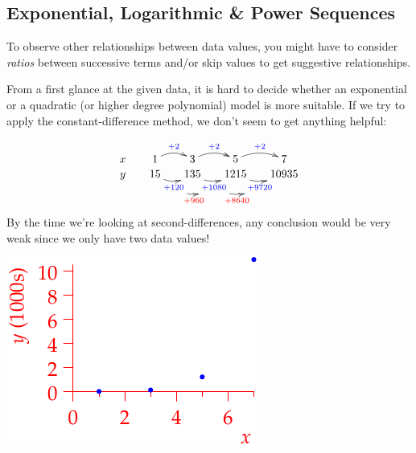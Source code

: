 \clearpage





\subsection{Exponential, Logarithmic \& Power Sequences}

To observe other relationships between data values, you might have to consider \emph{ratios} between successive terms and/or skip values to get suggestive relationships.

\begin{example}{}{}
From a first glance at the given data, it is hard to decide whether an exponential or a quadratic (or higher degree polynomial) model is more suitable. If we try to apply the constant-difference method, we don't seem to get anything helpful:\par
\begin{minipage}[t]{0.65\linewidth}\vspace{0pt}
\[
	\xymatrix @R0pt @C15pt{
		x & 1 \ar@/^/[r]^{\textcolor{blue}{+2}} & 3 \ar@/^/[r]^{\textcolor{blue}{+2}} &  5 \ar@/^/[r]^{\textcolor{blue}{+2}} & 7 \\
		y & 15 \ar@/_/[r]_{\textcolor{blue}{+120}}="a" & 135 \ar@/_/[r]_{\textcolor{blue}{+1080}}="b" & 1215 \ar@/_/[r]_{\textcolor{blue}{+9720}}="c" & 10935 
		\ar @/_/_{\textcolor{red}{+960}} "a";"b" \ar @/_/_{\textcolor{red}{+8640}} "b";"c" 
	}
\]
By the time we're looking at second-differences, any conclusion would be very weak since we only have two data values!
\end{minipage}\hfill\begin{minipage}[t]{0.34\linewidth}\vspace{-10pt}
\flushright\includegraphics{seqquadex4}
\end{minipage}\medbreak


\end{example}
